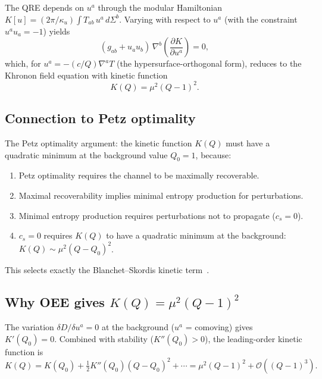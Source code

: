 \documentclass[aps,prd,preprint,superscriptaddress,longbibliography]{revtex4-2}
\newcommand{\KL}{D}
\begin{document}
The QRE depends on $u^a$ through the modular Hamiltonian
$K[u] = (2\pi/\kappa_u)\int T_{ab}\,u^a\,d\Sigma^b$.
Varying with respect to $u^a$ (with the constraint
$u^a u_a = -1$) yields
\begin{equation}
(g_{ab}+u_a u_b)\,\nabla^b\!\left(\frac{\partial K}{\partial u^a}\right)
= 0,
\label{eq:khronon_eom}
\end{equation}
which, for $u^a = -(c/Q)\nabla^a T$ (the hypersurface-orthogonal
form), reduces to the Khronon field equation with kinetic function
\begin{equation}
K(Q) = \mu^2(Q-1)^2.
\label{eq:KQ}
\end{equation}

\subsection{Connection to Petz optimality}

The Petz optimality argument: the kinetic function $K(Q)$ must have a
quadratic minimum at the background value $Q_0 = 1$, because:
\begin{enumerate}
\item Petz optimality requires the channel to be maximally recoverable.
\item Maximal recoverability implies minimal entropy production for perturbations.
\item Minimal entropy production requires perturbations not to propagate
  ($c_s = 0$).
\item $c_s = 0$ requires $K(Q)$ to have a quadratic minimum at the
  background: $K(Q) \sim \mu^2(Q-Q_0)^2$.
\end{enumerate}

This selects exactly the Blanchet--Skordis kinetic
term~\cite{BlanchetSkordis2024}.

\subsection{Why OEE gives $K(Q) = \mu^2(Q-1)^2$}

The variation $\delta\KL/\delta u^a = 0$ at the background
($u^a$ = comoving) gives $K'(Q_0) = 0$.  Combined with stability
($K''(Q_0) > 0$), the leading-order kinetic function is
\begin{equation}
K(Q) = K(Q_0) + \tfrac{1}{2}K''(Q_0)(Q-Q_0)^2 + \cdots
= \mu^2(Q-1)^2 + \mathcal{O}((Q-1)^3).
\end{equation}

\end{document}
